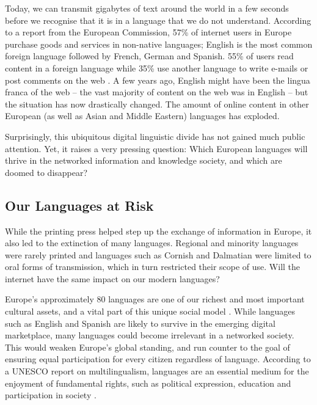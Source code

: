 \begin{multicols}{2}
Today, we can transmit gigabytes of text around the world in a few
seconds before we recognise that it is in a language that we do not
understand. According to a report from the European Commission,
57\% of internet users in Europe purchase goods and services in non-native
languages; English is the most
common foreign language followed by French, German and Spanish. 55\%
of users read content in a foreign language while 35\% use another
language to write e-mails or post comments on the web \cite{EC1}. A
few years ago, English might have been the lingua franca of the
web -- the vast majority of content on the web was in English -- but the
situation has now drastically changed. The amount of online content in
other European (as well as Asian and Middle Eastern) languages has
exploded.

Surprisingly, this ubiquitous digital linguistic divide has not gained
much public attention. Yet, it raises a very pressing question: Which European languages will thrive in the networked information and knowledge society, and which are doomed to disappear?

\subsection{Our Languages at Risk}

While the printing press helped step up the exchange of information in
Europe, it also led to the extinction of many
languages. Regional and minority languages were rarely printed and
languages such as Cornish and Dalmatian were limited to oral forms of
transmission, which in turn restricted their scope of use. Will the
internet have the same impact on our modern languages?


Europe’s approximately 80 languages are one of our richest and most important cultural assets, and a vital part of this unique social model \cite{EC2}. While languages such as English and Spanish are likely to survive in the emerging digital marketplace, many languages could become irrelevant in a networked society. This would weaken Europe’s global standing, and run counter to the goal of ensuring equal participation for every citizen regardless of language. According to a UNESCO report on multilingualism, languages are an essential medium for the enjoyment of fundamental rights, such as political expression, education and participation in society \cite{Unesco1}.


\end{multicols}
